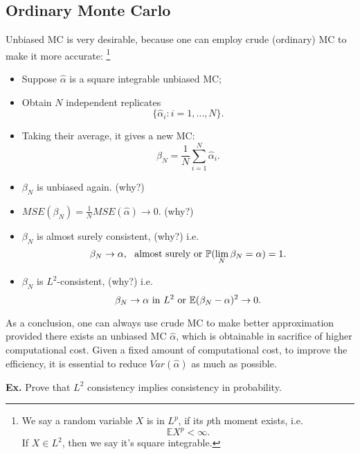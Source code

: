 \documentclass{article}
\begin{document}
\subsection{Ordinary Monte Carlo}
Unbiased MC is very desirable, because one can employ crude (ordinary) MC
to make it more accurate:
\footnote{We say a random variable $X$ is in $L^p$, if its $p$th moment exists, 
i.e. $$\mathbb E X^p <\infty .$$
If $X\in L^2$, then we say it's square integrable.}
\begin{itemize}
 \item Suppose $\hat \alpha$ is a square integrable unbiased MC;
 \item Obtain $N$ independent replicates
 $$\{\hat \alpha_i: i = 1,\ldots, N\}.$$
 \item Taking their average, it gives a new MC:
 $$\beta_N = \frac 1 N \sum_{i=1}^N \hat \alpha_i.$$
 \item $\beta_N$ is unbiased again. (why?)
 \item $MSE(\beta_N) = \frac 1 N MSE(\hat \alpha) \to 0$. (why?)
 \item $\beta_N$ is almost surely consistent,
  (why?)  i.e. 
  $$\beta_{N} \to \alpha, \ \hbox{ almost surely  or }
  \mathbb P(\lim_N \beta_N = \alpha) = 1.$$
  \item $\beta_N$ is $L^2$-consistent,  (why?) i.e.
  $$\beta_{N} \to \alpha \hbox{ in } L^{2} \hbox{ or }
  \mathbb E (\beta_N - \alpha)^2 \to 0.$$
\end{itemize}



As a conclusion, one can always use crude MC to make better approximation provided there exists an unbiased MC $\hat \alpha$, which is obtainable in sacrifice of  higher computational cost.
Given a fixed amount of computational cost, to improve the efficiency, it is essential to reduce $Var(\hat \alpha)$ as much as possible.

{\bf Ex.}
Prove that $L^2$ consistency implies consistency in probability.
\end{document}
